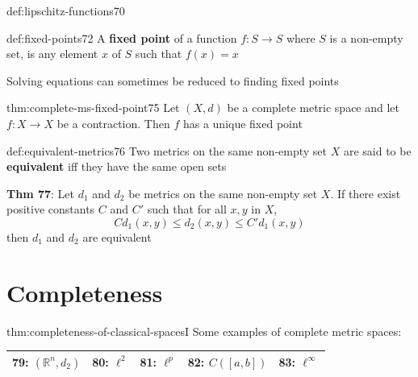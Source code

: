 \documentclass[landscape, 8pt]{extarticle}
\begin{document}
\begin{multicols}{3}
\begin{dfn}{def:lipschitz-functions}{70}
\end{dfn}

\begin{dfn}{def:fixed-points}{72}
    A \textbf{fixed point} of a function $f: S \to S $ where $S$ is a non-empty set, is any element $x$ of $S$ such that $f(x) = x$

    Solving equations can sometimes be reduced to finding fixed points
\end{dfn}

\begin{thm}{thm:complete-ms-fixed-point}{75}
    Let $(X, d)$ be a complete metric space and let $f : X \to X$ be a contraction. Then $f$ has a unique fixed point
\end{thm}


\begin{dfn}{def:equivalent-metrics}{76}
    Two metrics on the same non-empty set $X$ are said to be \textbf{equivalent} iff they have the same open sets

    \longrule{0.08ex}
    \textbf{Thm 77}: Let $d_{1}$ and $d_{2}$ be metrics on the same non-empty set $X$. If there exist positive constants $C$ and $C'$ such that for all $x, y$ in $X$,
    \[Cd_{1}(x, y) \le d_{2}(x, y) \le C'd_{1}(x, y)\]
    then $d_{1}$ and $d_{2}$ are equivalent
\end{dfn}



\newpage

\section{Completeness}
\begin{thm}{thm:completeness-of-classical-spaces}{I}
    \vspace{-5pt}
    Some examples of complete metric spaces:

    \vspace{-6pt}
    \begin{center}
    \def\arraystretch{1.7}
    \begin{tabular}{ |c|c|c|c|c| }
        \hline
        \textbf{79}: $(\mathbb{R}^{n}, d_{2})$ & \textbf{80}: $\ell^{2}$ & \textbf{81}: $\ell^{p}$ & \textbf{82}: $C([a, b])$ & \textbf{83}: $\ell^{\infty}$ \\
        \hline
    \end{tabular}
    \end{center}


\end{thm}
\end{multicols}
\end{document}
